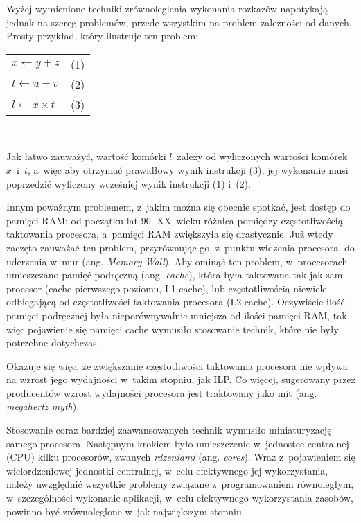 \par
%
\indent
	Wyżej wymienione techniki zrównoleglenia wykonania rozkazów napotykają jednak na szereg problemów, przede wszystkim na problem
	zależności od danych.
	Prosty przykład, który ilustruje ten problem:
	\begin{flushright}
	\begin{tabular}{l l}\\
		$x \gets y + z$ & \hspace{4.2cm} (1)\\
		$t \gets u + v$ & \hspace{4.2cm} (2)\\
		$l \gets x \times t$ & \hspace{4.2cm} (3)\\
	\end{tabular}\\
	\end{flushright}
	Jak łatwo zauważyć, wartość komórki $l$~zależy od wyliczonych wartości komórek $x$~i~$t$, a~więc aby otrzymać prawidłowy wynik
	instrukcji (3), jej wykonanie musi poprzedzić wyliczony wcześniej wynik instrukcji (1) i~(2).
\par
%
\indent
	Innym poważnym problemem, z~jakim można się obecnie spotkać, jest dostęp do pamięci RAM: od początku lat 90. XX~wieku różnica
	pomiędzy częstotliwością taktowania procesora, a~pamięci RAM zwiększyła się drastycznie. Już wtedy zaczęto zauważać
	ten problem, przyrównując go, z~punktu widzenia procesora, do uderzenia w~mur (ang. \emph{Memory Wall}). Aby ominąć ten problem,
	w~procesorach umieszczano pamięć podręczną (ang. \emph{cache}), która była taktowana tak jak sam procesor (cache pierwszego poziomu, L1 cache),
	lub częstotliwością niewiele odbiegającą od częstotliwości taktowania procesora (L2 cache). Oczywiście ilość pamięci podręcznej
	była nieporównywalnie mniejsza od ilości pamięci RAM, tak więc pojawienie się pamięci cache wymusiło stosowanie technik, które nie
	były potrzebne dotychczas.
\par
%
\indent
	Okazuje się więc, że zwiększanie częstotliwości taktowania procesora nie wpływa na wzrost jego wydajności w~takim stopniu, jak ILP.
	Co więcej, sugerowany przez producentów wzrost wydajności procesora jest traktowany jako mit (ang. \emph{megahertz myth}).
\par
%
\indent
	Stosowanie coraz bardziej zaawansowanych technik wymusiło miniaturyzację samego procesora. Następnym krokiem było umieszczenie w~jednostce
	centralnej (CPU) kilku procesorów, zwanych \emph{rdzeniami} (ang. \emph{cores}). Wraz z~pojawieniem się wielordzeniowej jednostki centralnej,
	w~celu efektywnego jej wykorzystania, należy uwzględnić wszystkie problemy związane z~programowaniem równoległym, w~szczególności
	wykonanie aplikacji, w~celu efektywnego wykorzystania zasobów, powinno być zrównoleglone w~jak największym stopniu.
\par
%
